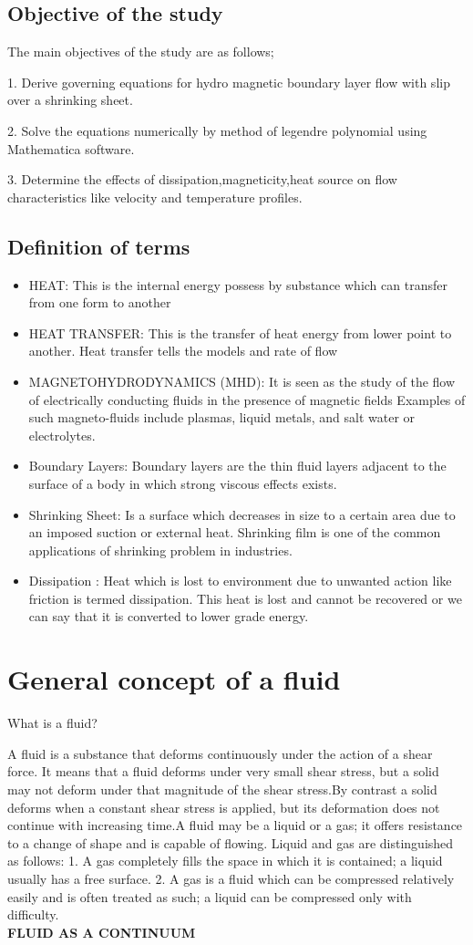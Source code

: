 \documentclass[a4paper,12pt]{report}
\begin{document}
{\subsection{Objective of the study}
The main objectives of the study are as follows;

1. Derive governing equations for hydro magnetic boundary layer flow with slip over a shrinking sheet.

2. Solve the equations numerically by method of legendre polynomial using Mathematica software.

3. Determine the effects of dissipation,magneticity,heat source on flow characteristics like velocity and temperature profiles.
\subsection{Definition of terms}
\begin{itemize}
	\item HEAT: This is the internal energy possess by substance which can transfer from one form to another
	\item HEAT TRANSFER: This is the transfer of heat energy from lower point to another. Heat transfer tells the models and rate of flow
	\item MAGNETOHYDRODYNAMICS (MHD): It is  seen as the study of the flow of electrically conducting fluids in the presence of magnetic fields Examples of such magneto-fluids include plasmas, liquid metals, and salt water or electrolytes.
	\item Boundary Layers: Boundary layers are the thin fluid layers adjacent to the surface of a body in which strong viscous effects exists.
	\item Shrinking Sheet: Is a surface which decreases in size to a certain area due to an imposed suction or external heat. Shrinking film is one of the common applications of shrinking problem in industries.
	\item Dissipation : Heat which is lost to environment due to unwanted action like friction is termed dissipation. This heat is lost and cannot be recovered or we can say that it is converted to lower grade energy.  
\end{itemize}
\section{General concept of a fluid}
What is a fluid?


A fluid is a substance that deforms continuously under the action of a shear force. It means that a fluid deforms under very small shear stress, but a solid may not deform under that magnitude of the shear stress.By contrast a solid deforms when a constant shear stress is applied, but its deformation does not continue with increasing time.A fluid may be a liquid or a gas; it offers resistance to a change of shape and is capable of flowing. Liquid and gas are distinguished as follows: 
1. A gas completely fills the space in which it is contained; a liquid usually has a free surface. 
2. A gas is a fluid which can be compressed relatively easily and is often treated as such; a liquid can be compressed only with difficulty.\\
\textbf{FLUID AS A CONTINUUM} 


}
\end{document}
